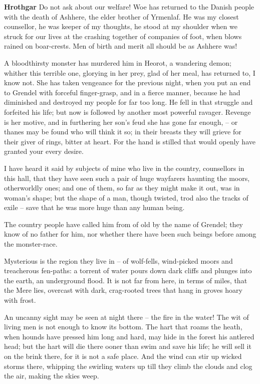 \documentclass[a4paper]{article}
\begin{document}
{\textbf{Hrothgar} Do not ask about our welfare! Woe has returned
to the Danish people with the death of Ashhere,
the elder brother of Yrmenlaf.
He was my closest counsellor, he was keeper of my thoughts,
he stood at my shoulder when we struck for our lives
at the crashing together of companies of foot,
when blows rained on boar-crests. Men of birth and merit
all should be as Ashhere was!

A bloodthirsty monster has murdered him in Heorot,
a wandering demon; whither this terrible one,
glorying in her prey, glad of her meal,
has returned to, I know not. She has taken vengeance
for the previous night, when you put an end to Grendel
with forceful finger-grasp, and in a fierce manner,
because he had diminished and destroyed my people
for far too long. He fell in that struggle
and forfeited his life; but now is followed by another
most powerful ravager. Revenge is her motive,
and in furthering her son’s feud she has gone far enough,
– or thanes may be found who will think it so;
in their breasts they will grieve for their giver of rings,
bitter at heart. For the hand is stilled
that would openly have granted your every desire.

I have heard it said by subjects of mine
who live in the country, counsellors in this hall,
that they have seen such a pair
of huge wayfarers haunting the moors,
otherworldly ones; and one of them,
so far as they might make it out,
was in woman’s shape; but the shape of a man,
though twisted, trod also the tracks of exile
– save that he was more huge than any human being.

The country people have called him from of old
by the name of Grendel; they know of no father for him,
nor whether there have been such beings before
among the monster-race.

Mysterious is the region
they live in – of wolf-fells, wind-picked moors
and treacherous fen-paths: a torrent of water
pours down dark cliffs and plunges into the earth,
an underground flood. It is not far from here,
in terms of miles, that the Mere lies,
overcast with dark, crag-rooted trees
that hang in groves hoary with frost.

An uncanny sight may be seen at night there
– the fire in the water! The wit of living men
is not enough to know its bottom.
The hart that roams the heath, when hounds have pressed him
long and hard, may hide in the forest
his antlered head; but the hart will die there
ooner than swim and save his life;
he will sell it on the brink there, for it is not a safe place.
And the wind can stir up wicked storms there,
whipping the swirling waters up
till they climb the clouds and clog the air,
making the skies weep.

}
\end{document}

